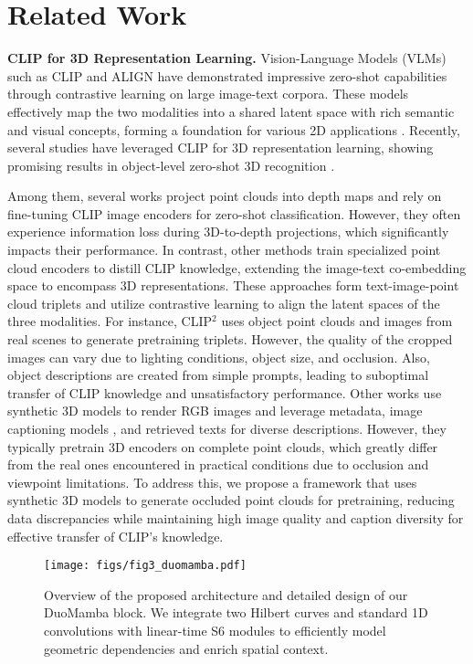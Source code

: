 \vspace{-2mm}
\section{Related Work}
\label{sec:related_work}
\noindent\textbf{CLIP for 3D Representation Learning.}
Vision-Language Models (VLMs) such as CLIP \cite{2dclip} and ALIGN \cite{align} have demonstrated impressive zero-shot capabilities through contrastive learning on large image-text corpora. These models effectively map the two modalities into a shared latent space with rich semantic and visual concepts, forming a foundation for various 2D applications \cite{detic,dalle,sam,imagegen}. Recently, several studies have leveraged CLIP for 3D representation learning, showing promising results in object-level zero-shot 3D recognition \cite{ulip,openshape,pointclip,clip2point,clip2,mixcon3d,tamm,opendlign}.

Among them, several works \cite{pointclip,pointclipv2,clip2point,opendlign} project point clouds into depth maps and rely on fine-tuning CLIP image encoders for zero-shot classification. However, they often experience information loss during 3D-to-depth projections, which significantly impacts their performance. In contrast, other methods \cite{clip2,ulip,ulip2,openshape,uni3d,tamm,mixcon3d} train specialized point cloud encoders to distill CLIP knowledge, extending the image-text co-embedding space to encompass 3D representations. These approaches form text-image-point cloud triplets and utilize contrastive learning to align the latent spaces of the three modalities. For instance, CLIP$^2$ \cite{clip2} uses object point clouds and images from real scenes to generate pretraining triplets. However, the quality of the cropped images can vary due to lighting conditions, object size, and occlusion. Also, object descriptions are created from simple prompts, leading to suboptimal transfer of CLIP knowledge and unsatisfactory performance. 
Other works \cite{ulip,ulip2,openshape,uni3d,tamm,mixcon3d} use synthetic 3D models to render RGB images and leverage metadata, image captioning models \cite{blip}, and retrieved texts for diverse descriptions. However, they typically pretrain 3D encoders on complete point clouds, which greatly differ from the real ones encountered in practical conditions due to occlusion and viewpoint limitations. To address this, we propose a framework that uses synthetic 3D models to generate occluded point clouds for pretraining, reducing data discrepancies while maintaining high image quality and caption diversity for effective transfer of CLIP's knowledge.
\begin{figure*}[!t]
    \centering
    \texttt{[image: figs/fig3\_duomamba.pdf]}
    \vspace{-8mm}
    \caption{Overview of the proposed architecture and detailed design of our DuoMamba block. We integrate two Hilbert curves \cite{hilbert_curve} and standard 1D convolutions with linear-time S6 \cite{mamba} modules to efficiently model geometric dependencies and enrich spatial context. }
    \label{fig:fig3_proposed_model}
    \vspace{-5mm}    
\end{figure*}

